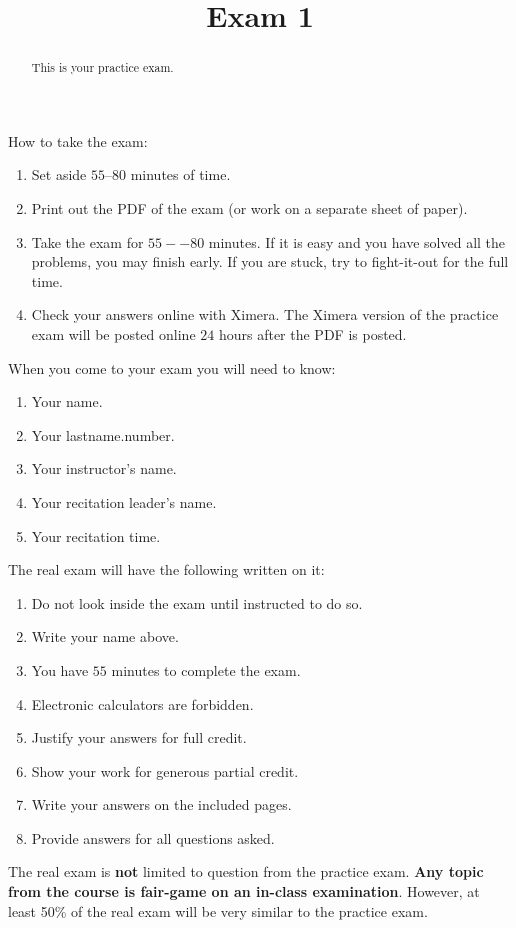 \documentclass{ximera}
\title{Exam 1}
\begin{document}
\begin{abstract}
This is your practice exam.
\end{abstract}
\maketitle

How to take the exam:
\begin{enumerate}
  \item Set aside $55$--$80$ minutes of time.
  \item Print out the PDF of the exam (or work on a separate sheet of paper).
  \item Take the exam for $55--80$ minutes. If it is easy and you have
    solved all the problems, you may finish early. If you are stuck,
    try to fight-it-out for the full time.
  \item Check your answers online with Ximera. The Ximera version of
    the practice exam will be posted online $24$ hours after the PDF is
    posted.
\end{enumerate}


When you come to your exam you will need to know:
\begin{enumerate}
\item Your name.
\item Your lastname.number.
\item Your instructor's name.
\item Your recitation leader's name.
\item Your recitation time.
\end{enumerate}

The real exam will have the following written on it:

\begin{enumerate}
\item Do not look inside the exam until instructed to do so.
\item Write your name above.
\item You have $55$ minutes to complete the exam.
\item Electronic calculators are forbidden.
\item Justify your answers for full credit.
\item Show your work for generous partial credit.
\item Write your answers on the included pages.
\item Provide answers for all questions asked.
\end{enumerate}

The real exam is \textbf{not} limited to question from the practice
exam. \textbf{Any topic from the course is fair-game on an in-class
  examination}.  However, at least 50\% of the real exam will be very
similar to the practice exam.
\end{document}
